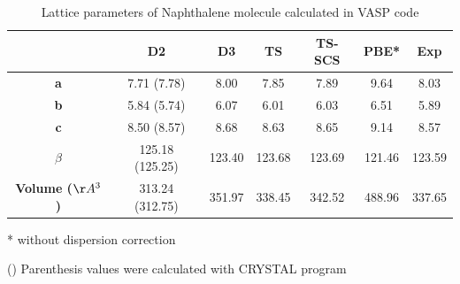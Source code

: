  	\begin{table}[H]
 		\caption{Lattice parameters of Naphthalene molecule calculated in VASP code} \label{table-Naphsol}
 		\begin{center}
 			\begin{threeparttable}
 			\begin{tabular}{c c c c c c c}
 				\toprule
 				& \textbf{D2} & \textbf{D3} & \textbf{TS} & \textbf{TS-SCS} & \textbf{PBE*} & \textbf{Exp} \\
 				\midrule
 				\textbf{a} &7.71 (7.78) & 8.00 & 7.85 & 7.89 & 9.64 & 8.03\\
 				\textbf{b}& 5.84 (5.74) & 6.07 & 6.01 & 6.03 & 6.51 & 5.89 \\
 				\textbf{c}& 8.50 (8.57) & 8.68 & 8.63 & 8.65 & 9.14 & 8.57 \\
 				\textbf{$\beta$} & 125.18 (125.25) & 123.40 & 123.68 & 123.69 & 121.46 & 123.59\\
 				\textbf{Volume ($\AA^{3}$)} & 313.24 (312.75) & 351.97 & 338.45 & 342.52 & 488.96 & 337.65\\
 				\bottomrule
 			\end{tabular}
 			
 			\begin{tablenotes}
 				\item[*] without dispersion correction
 				\item[()] Parenthesis values were calculated with CRYSTAL program
 			\end{tablenotes}
 		\end{threeparttable}
 		\end{center}
 	\end{table}
 

